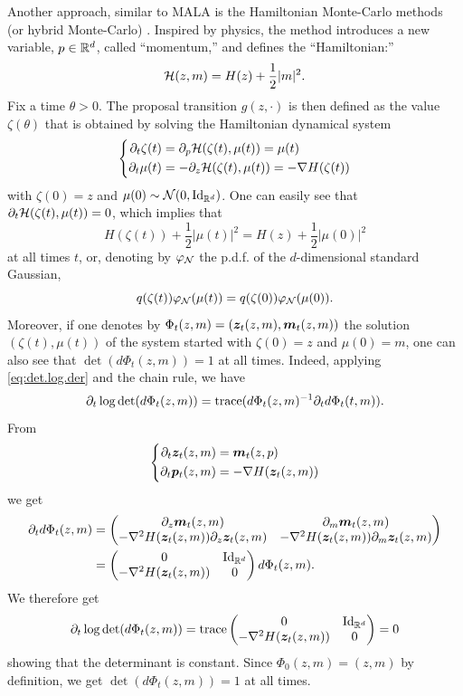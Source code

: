 Another approach, similar to MALA is the Hamiltonian Monte-Carlo methods (or hybrid Monte-Carlo) \citep{duane1987hybrid,neal2012mcmc}. Inspired by physics, the method introduces a new variable, $p\in {\mathbb{R}}^d$, called ``momentum,'' and defines the ``Hamiltonian:''
\[
{\mathcal H}(z, m) = H(z) +\frac{1}{2} |m|^2.
\]
Fix a time $\theta>0$.
The proposal transition $g(z, \cdot)$ is then defined as the value $\zeta(\theta)$ that is obtained by solving the Hamiltonian dynamical system
\begin{equation}
\label{eq:ham.mcmc.system}
\left\{
\begin{aligned}
\partial_t \zeta(t) &= \partial_p {\mathcal H}(\zeta(t), \mu(t)) = \mu(t)\\
\partial_t \mu(t) &= -\partial_z {\mathcal H}(\zeta(t), \mu(t)) = -\nabla H(\zeta(t))
\end{aligned}
\right.
\end{equation}
with $\zeta(0) = z$ and $\mu(0) \sim \CN(0, \Id[d])$. One can easily see that $\partial_t {\mathcal H}(\zeta(t), \mu(t)) = 0$, which implies that 
\[
H(\zeta(t)) + \frac{1}{2} |\mu(t)|^2 = H(z) + \frac{1}{2} |\mu(0)|^2 
\]
at all times $t$, or, denoting by $\varphi_{{\mathcal N}}$ the p.d.f. of the $d$-dimensional standard Gaussian, 
\[
q(\zeta(t)) \varphi_{{\mathcal N}}(\mu(t))  = q(\zeta(0)) \varphi_{{\mathcal N}}(\mu(0)).
\]
Moreover, if one denotes by $\Phi_t(z, m) = ({\bm{z}}_t(z, m), {\bm{m}}_t(z, m))$ the solution $(\zeta(t), \mu(t))$ of the system started with $\zeta(0)= z$ and $\mu(0) = m$, one can also see that $\det(d\Phi_t( z, m)) = 1$ at all times. Indeed, applying \cref{eq:det.log.der} and the chain rule, we have
\[
\partial_t \log \det(d\Phi_t( z, m)) = {\mathrm{trace}}(d\Phi_t( z, m)^{-1} \partial_t d\Phi_t(t,m)).
\]
From
\[\left\{
\begin{aligned}
\partial_t {\bm{z}}_t(z, m) &= {\bm{m}}_t(z,p)\\
\partial_t {\bm{p}}_t(z, m) &= - \nabla H({\bm{z}}_t(z,m))
\end{aligned}
\right.
\]
we get
\begin{align*}
\partial_t d\Phi_t(z, m)& = 
\begin{pmatrix} 
\partial_z \bfm_t(z, m) & \partial_m \bfm_t(z,m) \\
 - \nabla^2 H(\bfz_t(z,m)) \partial_z \bfz_t(z, m) & - \nabla^2 H(\bfz_t(z,m)) \partial_m \bfz_t(z, m)
 \end{pmatrix}\\
 &=   \begin{pmatrix} 0 & \Id[d] \\ 
  - \nabla^2 H(\bfz_t(z,m)) & 0
 \end{pmatrix} d\Phi_t(z,m).
 \end{align*}
 We therefore get 
\[
\partial_t \log \det(d\Phi_t( z, m)) = \trace\begin{pmatrix} 0 & \Id[d] \\ 
  - \nabla^2 H(\bfz_t(z,m)) & 0
 \end{pmatrix} = 0
\]
showing that the determinant is constant.
Since $\Phi_0(z,m) = (z,m)$ by definition, we get $\det(d\Phi_t( z, m)) = 1$ at all times. 


